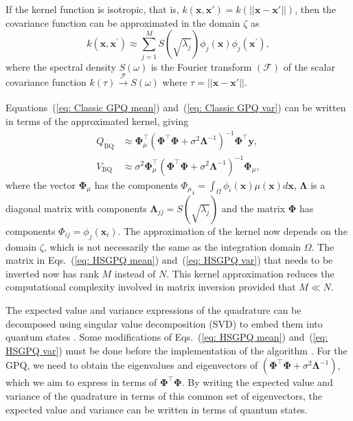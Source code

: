\documentclass[10pt]{article}
\begin{document}
	If the kernel function is isotropic, that is,  $k(\mathbf{x}, \mathbf{x}') = k(||\mathbf{x}-\mathbf{x}'||)$, then the covariance function can be approximated in the domain $\zeta$ as \citep{Solin2020HilbertSpaceGPR}
	\begin{equation}
		k\left(\mathbf{x}, \mathbf{x}^{\prime}\right) \approx \sum_{j = 1}^{M} S\left(\sqrt{\lambda_j}\right) \phi_j(\mathbf{x}) \phi_j\left(\mathbf{x}^{\prime}\right),
		\label{eq: Kernel approximation}
	\end{equation}
	where the spectral density $S(\omega)$ is the Fourier transform $(\mathcal{F})$ of the scalar covariance function $k(\tau) \xrightarrow[]{\mathcal{F}} S(\omega)$ where $\tau = ||\mathbf{x}-\mathbf{x}'||$. 
	
	Equations~(\ref{eq: Classic GPQ mean}) and~(\ref{eq: Classic GPQ var}) can be written in terms of the approximated kernel, giving
	\begin{eqnarray} 
		Q_{\mathrm{BQ}}&\approx \boldsymbol{\Phi}_\mu^{\top}(\boldsymbol{\Phi}^{\top} \boldsymbol{\Phi} + \sigma^2 \boldsymbol{\Lambda}^{-1})^{-1} \boldsymbol{\Phi}^{\top} \mathbf{y}\label{eq: HSGPQ mean}  , \\
		V_{\mathrm{BQ}}&\approx \sigma^2 \boldsymbol{\Phi}_\mu^{\top}(\boldsymbol{\Phi}^{\top} \boldsymbol{\Phi} + \sigma^2 \boldsymbol{\Lambda}^{-1})^{-1}\boldsymbol{\Phi}_{\mu}\label{eq: HSGPQ var},
	\end{eqnarray}
	where the vector $\boldsymbol{\Phi}_\mu$ has the components ${\Phi_{\mu}}_i = \int_{\Omega} \phi_i(\mathbf{x})\mu(\mathbf{x})d\mathbf{x}$, $\boldsymbol{\Lambda}$ is a diagonal matrix with components $\boldsymbol{\Lambda}_{jj} = S(\sqrt{\lambda_j})$ and the matrix $\boldsymbol{\Phi}$ has components $\Phi_{ij} = \phi_j(\mathbf{x}_i)$. 
	The approximation of the kernel now depends on the domain $\zeta$, which is not necessarily the same as the integration domain $\Omega$. The matrix in Eqs.~(\ref{eq: HSGPQ mean}) and~(\ref{eq: HSGPQ var}) that needs to be inverted now has rank $M$ instead of $N$.
	This kernel approximation reduces the computational complexity involved in matrix inversion provided that $M \ll N$. 
	
	The expected value and variance expressions of the quadrature can be decomposed using singular value decomposition (SVD) to embed them into quantum states \citep{Schuld2016QLinearRegresion}. Some modifications of Eqs.~(\ref{eq: HSGPQ mean}) and~(\ref{eq: HSGPQ var}) must be done before the implementation of the algorithm \citep{Farooq2024QAHSGPR}.  For the GPQ, we need to obtain the eigenvalues and eigenvectors of $\left( \boldsymbol{\Phi}^{\top} \boldsymbol{\Phi} + \sigma^2 \boldsymbol{\Lambda}^{-1} \right)$, which we aim to express in terms of $\boldsymbol{\Phi}^{\top} \boldsymbol{\Phi}$. By writing the expected value and variance of the quadrature in terms of this common set of eigenvectors, the expected value and variance can be written in terms of quantum states.
	
\end{document}
